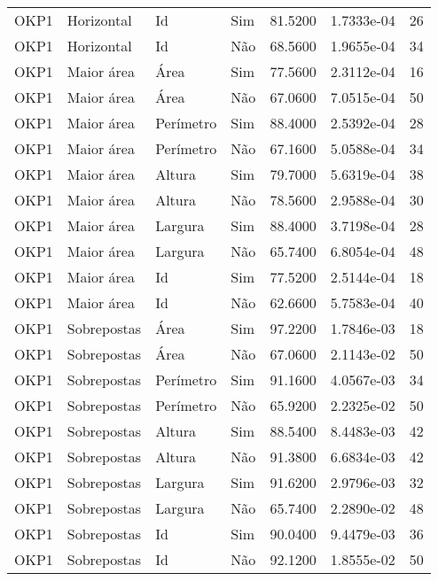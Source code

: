 \begin{tabular}{llllrrr}
    OKP1      & Horizontal  & Id        & Sim         & 81.5200      & 1.7333e-04 & 26       \\
    OKP1      & Horizontal  & Id        & Não         & 68.5600      & 1.9655e-04 & 34       \\
    OKP1      & Maior área  & Área      & Sim         & 77.5600      & 2.3112e-04 & 16       \\
    OKP1      & Maior área  & Área      & Não         & 67.0600      & 7.0515e-04 & 50       \\
    OKP1      & Maior área  & Perímetro & Sim         & 88.4000      & 2.5392e-04 & 28       \\
    OKP1      & Maior área  & Perímetro & Não         & 67.1600      & 5.0588e-04 & 34       \\
    OKP1      & Maior área  & Altura    & Sim         & 79.7000      & 5.6319e-04 & 38       \\
    OKP1      & Maior área  & Altura    & Não         & 78.5600      & 2.9588e-04 & 30       \\
    OKP1      & Maior área  & Largura   & Sim         & 88.4000      & 3.7198e-04 & 28       \\
    OKP1      & Maior área  & Largura   & Não         & 65.7400      & 6.8054e-04 & 48       \\
    OKP1      & Maior área  & Id        & Sim         & 77.5200      & 2.5144e-04 & 18       \\
    OKP1      & Maior área  & Id        & Não         & 62.6600      & 5.7583e-04 & 40       \\
    OKP1      & Sobrepostas & Área      & Sim         & 97.2200      & 1.7846e-03 & 18       \\
    OKP1      & Sobrepostas & Área      & Não         & 67.0600      & 2.1143e-02 & 50       \\
    OKP1      & Sobrepostas & Perímetro & Sim         & 91.1600      & 4.0567e-03 & 34       \\
    OKP1      & Sobrepostas & Perímetro & Não         & 65.9200      & 2.2325e-02 & 50       \\
    OKP1      & Sobrepostas & Altura    & Sim         & 88.5400      & 8.4483e-03 & 42       \\
    OKP1      & Sobrepostas & Altura    & Não         & 91.3800      & 6.6834e-03 & 42       \\
    OKP1      & Sobrepostas & Largura   & Sim         & 91.6200      & 2.9796e-03 & 32       \\
    OKP1      & Sobrepostas & Largura   & Não         & 65.7400      & 2.2890e-02 & 48       \\
    OKP1      & Sobrepostas & Id        & Sim         & 90.0400      & 9.4479e-03 & 36       \\
    OKP1      & Sobrepostas & Id        & Não         & 92.1200      & 1.8555e-02 & 50       \\
    \hline
\end{tabular}